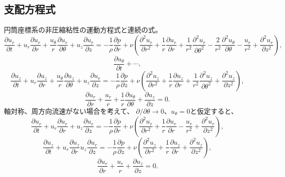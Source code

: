 \subsection{支配方程式}
円筒座標系の非圧縮粘性の運動方程式と連続の式。
\begin{equation}
 \frac{\partial u_r}{\partial t} + u_r\frac{\partial u_r}{\partial r}
  + \frac{u_\theta}{r}\frac{\partial u_r}{\partial\theta} +
  u_z\frac{\partial u_r}{\partial z} = 
  -\frac{1}{\rho}\frac{\partial p}{\partial r} 
  + \nu \left(\frac{\partial^2u_r}{\partial r^2}
	+\frac{1}{r}\frac{\partial u_r}{\partial r}
	+\frac{1}{r^2}\frac{\partial^2u_r}{\partial\theta^2}
	-\frac{2}{r^2}\frac{\partial^2u_{\theta}}{\partial\theta}
	-\frac{u_r}{r^2}
	+\frac{\partial^2u_r}{\partial z^2}\right),
\end{equation}
\begin{equation}
 \frac{\partial u_{\theta}}{\partial t} + \cdots,
\end{equation}
\begin{equation}
 \frac{\partial u_z}{\partial t} + u_r\frac{\partial u_z}{\partial r}
  + \frac{u_\theta}{r}\frac{\partial u_z}{\partial\theta} +
  u_z\frac{\partial u_r}{\partial z} = 
  -\frac{1}{\rho}\frac{\partial p}{\partial z} 
  + \nu \left(\frac{\partial^2u_z}{\partial r^2}
	 +\frac{1}{r}\frac{\partial u_z}{\partial r}
	+\frac{1}{r^2}\frac{\partial^2u_z}{\partial\theta^2}
	+\frac{\partial^2u_z}{\partial z^2}
	\right),
\end{equation}
\begin{equation}
 \frac{\partial u_r}{\partial r} + \frac{u_r}{r}
  +\frac{1}{r}\frac{\partial u_\theta}{\partial \theta}
	+\frac{\partial u_z}{\partial z} = 0.
\end{equation}
軸対称、周方向流速がない場合を考えて、
$\partial/\partial\theta\rightarrow 0$、$u_\theta = 0$と仮定すると、
\begin{equation}
 \frac{\partial u_r}{\partial t} + u_r\frac{\partial u_r}{\partial r}
  + u_z\frac{\partial u_r}{\partial z} = 
  -\frac{1}{\rho}\frac{\partial p}{\partial r} 
  + \nu \left(\frac{\partial^2u_r}{\partial r^2}
	+\frac{1}{r}\frac{\partial u_r}{\partial r}
	-\frac{u_r}{r^2}
	+\frac{\partial^2u_r}{\partial z^2}\right),
\end{equation}
\begin{equation}
 \frac{\partial u_z}{\partial t} + u_r\frac{\partial u_z}{\partial r}
  u_z\frac{\partial u_r}{\partial z} = 
  -\frac{1}{\rho}\frac{\partial p}{\partial z} 
  + \nu \left(\frac{\partial^2u_z}{\partial r^2}
	 +\frac{1}{r}\frac{\partial u_z}{\partial r}
	+\frac{\partial^2u_z}{\partial z^2}
	\right),
\end{equation}
\begin{equation}
 \frac{\partial u_r}{\partial r} + \frac{u_r}{r}
	+\frac{\partial u_z}{\partial z} = 0.
\end{equation}

